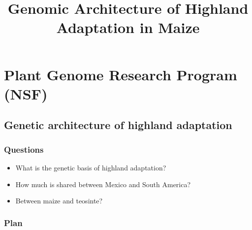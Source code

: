 \documentclass[]{article}
\begin{document}
\title{Genomic Architecture of Highland Adaptation in Maize}

\maketitle

\section{Plant Genome Research Program (NSF)}

\subsection{Genetic architecture of highland adaptation}

\subsubsection{Questions}
	\begin{itemize}	
		\item What is the genetic basis of highland adaptation?  
		\item How much is shared between Mexico and South America? 
		\item Between maize and teosinte? 
	\end{itemize}

\subsubsection{Plan}
\end{document}
